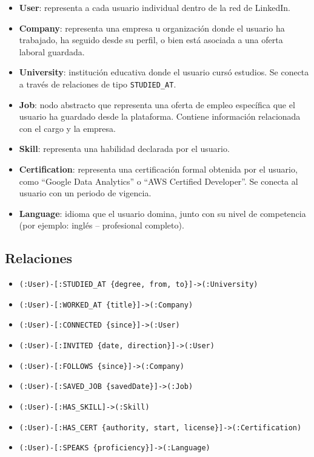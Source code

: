 \documentclass[10pt]{article}
\begin{document}
\begin{itemize}
	\item \textbf{User}: representa a cada usuario individual dentro de la red de LinkedIn.
	      
	\item \textbf{Company}: representa una empresa u organización donde el usuario ha trabajado, ha seguido desde su perfil, o bien está asociada a una oferta laboral guardada.
	      
	\item \textbf{University}: institución educativa donde el usuario cursó estudios. Se conecta a través de relaciones de tipo \texttt{STUDIED\_AT}.
	      
	\item \textbf{Job}: nodo abstracto que representa una oferta de empleo específica que el usuario ha guardado desde la plataforma. Contiene información relacionada con el cargo y la empresa.
	      
	\item \textbf{Skill}: representa una habilidad declarada por el usuario.
	      
	\item \textbf{Certification}: representa una certificación formal obtenida por el usuario, como “Google Data Analytics” o “AWS Certified Developer”. Se conecta al usuario con un periodo de vigencia.
	      
	\item \textbf{Language}: idioma que el usuario domina, junto con su nivel de competencia (por ejemplo: inglés – profesional completo).
\end{itemize}

\subsection*{Relaciones}
\begin{itemize}
	\item \texttt{(:User)-[:STUDIED\_AT \{degree, from, to\}]->(:University)}
	\item \texttt{(:User)-[:WORKED\_AT \{title\}]->(:Company)}
	\item \texttt{(:User)-[:CONNECTED \{since\}]->(:User)}
	\item \texttt{(:User)-[:INVITED \{date, direction\}]->(:User)}
	\item \texttt{(:User)-[:FOLLOWS \{since\}]->(:Company)}
	\item \texttt{(:User)-[:SAVED\_JOB \{savedDate\}]->(:Job)}
	\item \texttt{(:User)-[:HAS\_SKILL]->(:Skill)}
	\item \texttt{(:User)-[:HAS\_CERT \{authority, start, license\}]->(:Certification)}
	\item \texttt{(:User)-[:SPEAKS \{proficiency\}]->(:Language)}
\end{itemize}
\end{document}
